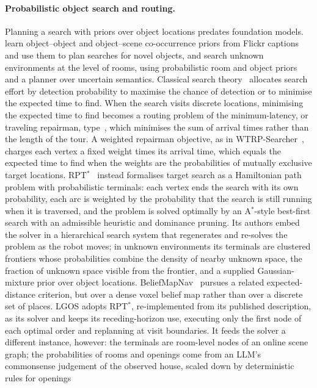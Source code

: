 \documentclass[10pt]{article}
\newcommand{\ours}{LGOS\xspace}
\begin{document}
\paragraph{Probabilistic object search and routing.}
Planning a search with priors over object locations predates foundation models.
\citet{kollar2009utilizing} learn object--object and object--scene co-occurrence priors from Flickr
captions and use them to plan searches for novel objects, and \citet{aydemir2013active} search unknown
environments at the level of rooms, using probabilistic room and object priors and a planner over
uncertain semantics. Classical search theory~\citep{stone1975theory} allocates search effort by detection
probability to maximise the chance of detection or to minimise the expected time to find. When the search
visits discrete locations, minimising the expected time to find becomes a routing problem of the
minimum-latency, or traveling repairman, type~\citep{blum1994minimum}, which minimises the sum of arrival
times rather than the length of the tour. A weighted repairman objective, as in
WTRP-Searcher~\citep{liu2026global}, charges each vertex a fixed weight times its arrival time, which
equals the expected time to find when the weights are the probabilities of mutually exclusive target
locations. RPT$^*$~\citep{lyu2026rpt} instead formalises target search as a Hamiltonian path problem with
probabilistic terminals: each vertex ends the search with its own probability, each arc is weighted by the
probability that the search is still running when it is traversed, and the problem is solved optimally by
an A$^*$-style best-first search with an admissible heuristic and dominance pruning. Its authors embed the
solver in a hierarchical search system that regenerates and re-solves the problem as the robot moves; in
unknown environments its terminals are clustered frontiers whose probabilities combine the density of
nearby unknown space, the fraction of unknown space visible from the frontier, and a supplied
Gaussian-mixture prior over object locations.
BeliefMapNav~\citep{zhou2025beliefmapnav} pursues a related expected-distance criterion, but over a dense
voxel belief map rather than over a discrete set of places. \ours adopts RPT$^*$, re-implemented from its
published description, as its solver and keeps its receding-horizon use, executing only the first node of
each optimal order and replanning at visit boundaries. It feeds the solver a different instance, however:
the terminals are room-level nodes of an online scene graph; the probabilities of rooms and openings come
from an LLM's commonsense judgement of the observed house, scaled down by deterministic rules for openings
\end{document}
